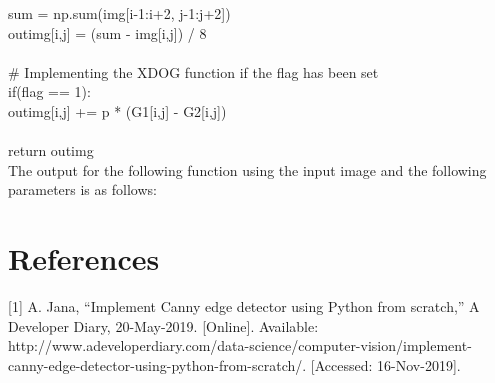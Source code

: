 \documentclass{article}
\begin{document}
	\indent \indent \indent \indent sum = np.sum(img[i-1:i+2, j-1:j+2])\\
	\indent \indent \indent \indent out\textunderscore img[i,j] = (sum - img[i,j]) / 8\\
	\\
	\indent \indent \indent \# Implementing the XDOG function if the flag has been set\\
	\indent \indent \indent if(flag == 1):\\
	\indent \indent \indent \indent out\textunderscore img[i,j] += p * (G1[i,j] - G2[i,j])\\
	\\
	\indent return out\textunderscore img\\
	
	The output for the following function using the input image and the following parameters is as follows:\\
	
	
	
	\clearpage
	
	\section{References}
	
	[1] A. Jana, “Implement Canny edge detector using Python from scratch,” A Developer Diary, 20-May-2019. [Online]. Available: http://www.adeveloperdiary.com/data-science/computer-vision/implement-canny-edge-detector-using-python-from-scratch/. [Accessed: 16-Nov-2019].
	
\end{document}
